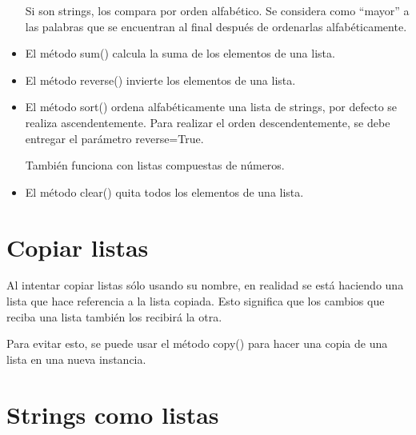 \documentclass{report}
\begin{document}
\begin{itemize}

  Si son strings, los compara por orden alfabético. Se considera como “mayor” a las palabras que se encuentran al final después de ordenarlas alfabéticamente.


  \item El método sum() calcula la suma de los elementos de una lista.
  

  \item El método reverse() invierte los elementos de una lista.
  

  \item El método sort() ordena alfabéticamente una lista de strings, por defecto se realiza ascendentemente. Para realizar el orden descendentemente, se debe entregar el parámetro reverse=True.
  
  
  También funciona con listas compuestas de números.


  \item El método clear() quita todos los elementos de una lista.


\end{itemize}

\section{Copiar listas}

Al intentar copiar listas sólo usando su nombre, en realidad se está haciendo una lista que hace referencia a la lista copiada. Esto significa que los cambios que reciba una lista también los recibirá la otra.


Para evitar esto, se puede usar el método copy() para hacer una copia de una lista en una nueva instancia.


\section{Strings como listas}
\end{document}

